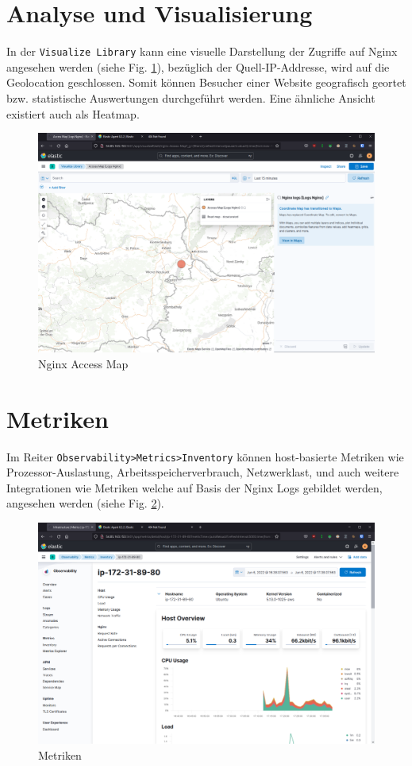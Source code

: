 \section{Analyse und Visualisierung}
In der \verb|Visualize Library| kann eine visuelle Darstellung
der Zugriffe auf Nginx angesehen werden (siehe Fig. \ref{fig:nginxAccessMap}), 
bezüglich der Quell-IP-Addresse,
wird auf die Geolocation geschlossen. Somit können Besucher einer Website
geografisch geortet bzw. statistische Auswertungen durchgeführt werden.
Eine ähnliche Ansicht existiert auch als Heatmap.

\begin{figure}[h]
	\centering
	\includegraphics[width=.99\linewidth]{fig/nginxAccessMap.png}
	\caption{Nginx Access Map}
	\label{fig:nginxAccessMap}	
\end{figure}

\section{Metriken}
Im Reiter \verb|Observability>Metrics>Inventory| können host-basierte
Metriken wie Prozessor-Auslastung, Arbeitsspeicherverbrauch,
Netzwerklast, und auch weitere Integrationen wie Metriken
welche auf Basis der Nginx Logs gebildet werden, angesehen werden
(siehe Fig. \ref{fig:metrics}).

\begin{figure}[h]
	\centering
	\includegraphics[width=.99\linewidth]{fig/metrics.png}
	\caption{Metriken}
	\label{fig:metrics}	
\end{figure}



